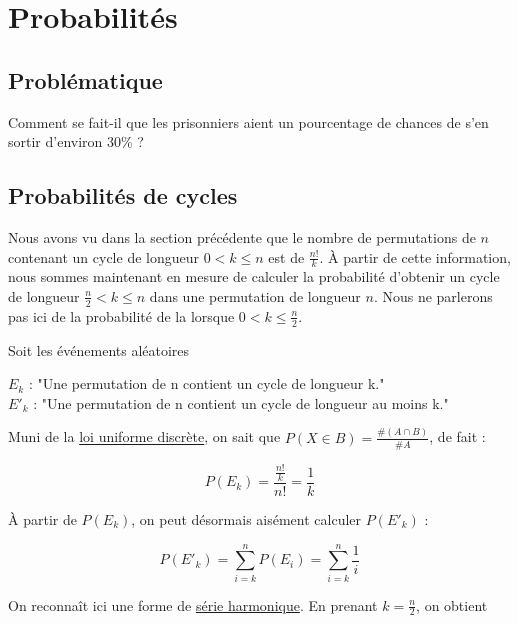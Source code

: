 \section{Probabilités}
\subsection{Problématique}

	Comment se fait-il que les prisonniers aient un pourcentage de chances de s'en sortir d'environ 30\% ? \\

\subsection{Probabilités de cycles}

	Nous avons vu dans la section précédente que le nombre de permutations de $n$ contenant un cycle de longueur $0 < k \leq n$ est de $\frac{n!}{k}$.
	À partir de cette information, nous sommes maintenant en mesure de calculer la probabilité d'obtenir un cycle de longueur $\frac{n}{2} < k \leq n$ dans une permutation de longueur $n$.
	Nous ne parlerons pas ici de la probabilité de la lorsque $0 < k \leq \frac{n}{2}$.

	Soit les événements aléatoires
	\begin{center}
		$E_k$ : "Une permutation de n contient un cycle de longueur k." \\
		$E'_k$ : "Une permutation de n contient un cycle de longueur au moins k."
	\end{center}

	Muni de la \href{https://fr.wikipedia.org/wiki/Loi_uniforme_discr%C3%A8te#Calcul_d'une_probabilit%C3%A9}{loi uniforme discrète}, on sait que $P(X \in B) = \frac{\#(A \cap B)}{\#A}$, de fait :

	\begin{equation}
		P(E_k) = \frac{\frac{n!}{k}}{n!} = \frac{1}{k}
	\end{equation}

	À partir de $P(E_k)$, on peut désormais aisément calculer $P(E'_k)$ :

	\begin{equation}
		P(E'_k) = \sum_{i = k}^{n} P(E_i) = \sum_{i = k}^{n} \frac{1}{i}
	\end{equation}

	On reconnaît ici une forme de \href{https://en.wikipedia.org/wiki/Harmonic_series_(mathematics)#}{série harmonique}.
	En prenant $k = \frac{n}{2}$, on obtient

